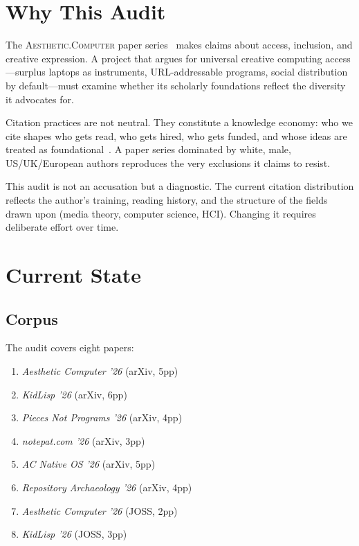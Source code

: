\documentclass[10pt,letterpaper,twocolumn]{article}
\newcommand{\ac}{\textsc{Aesthetic.Computer}}
\begin{document}

\section{Why This Audit}

The \ac{} paper series~\citep{scudder2026ac, scudder2026kidlisp, scudder2026acos, scudder2026pieces, scudder2026notepat} makes claims about access, inclusion, and creative expression. A project that argues for universal creative computing access---surplus laptops as instruments, URL-addressable programs, social distribution by default---must examine whether its scholarly foundations reflect the diversity it advocates for.

Citation practices are not neutral. They constitute a knowledge economy: who we cite shapes who gets read, who gets hired, who gets funded, and whose ideas are treated as foundational~\citep{benjamin2019race}. A paper series dominated by white, male, US/UK/European authors reproduces the very exclusions it claims to resist.

This audit is not an accusation but a diagnostic. The current citation distribution reflects the author's training, reading history, and the structure of the fields drawn upon (media theory, computer science, HCI). Changing it requires deliberate effort over time.


\section{Current State}

\subsection{Corpus}

The audit covers eight papers:

\begin{enumerate}
  \item \emph{Aesthetic Computer '26} (arXiv, 5pp)
  \item \emph{KidLisp '26} (arXiv, 6pp)
  \item \emph{Pieces Not Programs '26} (arXiv, 4pp)
  \item \emph{notepat.com '26} (arXiv, 3pp)
  \item \emph{AC Native OS '26} (arXiv, 5pp)
  \item \emph{Repository Archaeology '26} (arXiv, 4pp)
  \item \emph{Aesthetic Computer '26} (JOSS, 2pp)
  \item \emph{KidLisp '26} (JOSS, 3pp)
\end{enumerate}
\end{document}
